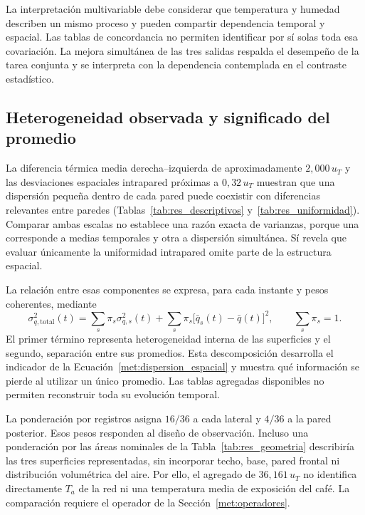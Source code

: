 La interpretación multivariable debe considerar que temperatura y humedad describen un mismo proceso y pueden compartir dependencia temporal y espacial. Las tablas de concordancia no permiten identificar por sí solas toda esa covariación. La mejora simultánea de las tres salidas respalda el desempeño de la tarea conjunta y se interpreta con la dependencia contemplada en el contraste estadístico.

\subsection{Heterogeneidad observada y significado del promedio}

La diferencia térmica media derecha--izquierda de aproximadamente $2{,}000\,u_T$ y las desviaciones espaciales intrapared próximas a $0{,}32\,u_T$ muestran que una dispersión pequeña dentro de cada pared puede coexistir con diferencias relevantes entre paredes (Tablas~\ref{tab:res_descriptivos} y~\ref{tab:res_uniformidad}). Comparar ambas escalas no establece una razón exacta de varianzas, porque una corresponde a medias temporales y otra a dispersión simultánea. Sí revela que evaluar únicamente la uniformidad intrapared omite parte de la estructura espacial.

La relación entre esas componentes se expresa, para cada instante y pesos coherentes, mediante
\begin{equation}
\sigma_{q,\mathrm{total}}^2(t)=
\sum_s\pi_s\sigma_{q,s}^2(t)
+\sum_s\pi_s\bigl[\bar q_s(t)-\bar q(t)\bigr]^2,
\qquad \sum_s\pi_s=1.
\label{eq:dis_varianza_espacial}
\end{equation}
El primer término representa heterogeneidad interna de las superficies y el segundo, separación entre sus promedios. Esta descomposición desarrolla el indicador de la Ecuación~\eqref{met:dispersion_espacial} y muestra qué información se pierde al utilizar un único promedio. Las tablas agregadas disponibles no permiten reconstruir toda su evolución temporal.

La ponderación por registros asigna $16/36$ a cada lateral y $4/36$ a la pared posterior. Esos pesos responden al diseño de observación. Incluso una ponderación por las áreas nominales de la Tabla~\ref{tab:res_geometria} describiría las tres superficies representadas, sin incorporar techo, base, pared frontal ni distribución volumétrica del aire. Por ello, el agregado de $36{,}161\,u_T$ no identifica directamente $T_a$ de la red ni una temperatura media de exposición del café. La comparación requiere el operador de la Sección~\ref{met:operadores}.

